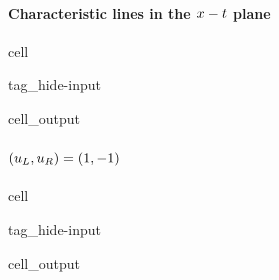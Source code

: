 \documentclass[letterpaper,10pt,english]{jupyterBook}
\begin{document}
\paragraph{Characteristic lines in the \protect\(x-t\protect\) plane}
\label{\detokenize{ch/pde/hyperbolic-non-convex:characteristic-lines-in-the-x-t-plane}}
\begin{sphinxuseclass}{cell}
\begin{sphinxuseclass}{tag_hide-input}\begin{sphinxVerbatimOutput}

\begin{sphinxuseclass}{cell_output}
\noindent{}

\end{sphinxuseclass}\end{sphinxVerbatimOutput}

\end{sphinxuseclass}
\end{sphinxuseclass}

\paragraph{\protect\((u_L, u_R) = (1, -1)\protect\)}
\label{\detokenize{ch/pde/hyperbolic-non-convex:id2}}
\begin{sphinxuseclass}{cell}
\begin{sphinxuseclass}{tag_hide-input}\begin{sphinxVerbatimOutput}

\begin{sphinxuseclass}{cell_output}
\noindent{}

\end{sphinxuseclass}\end{sphinxVerbatimOutput}

\end{sphinxuseclass}
\end{sphinxuseclass}
\end{document}
